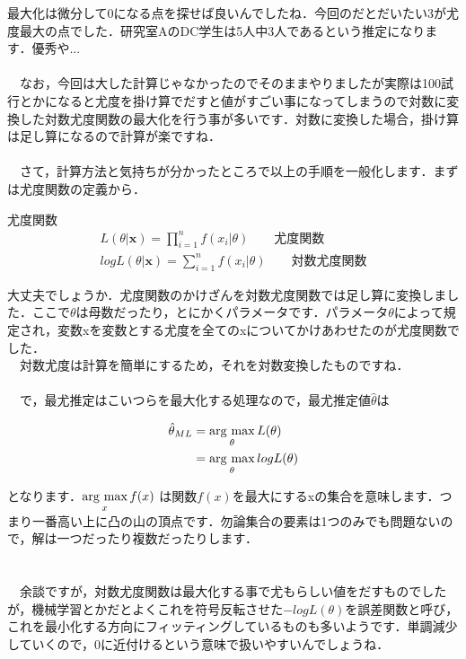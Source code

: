 \documentclass[11pt,a4paper]{ujreport} 	%
\newcommand{\argmax}{\mathop{\rm arg~max}\limits}
\begin{document}
最大化は微分して0になる点を探せば良いんでしたね．今回のだとだいたい3が尤度最大の点でした．研究室AのDC学生は5人中3人であるという推定になります．優秀や...\\
\\
　なお，今回は大した計算じゃなかったのでそのままやりましたが実際は100試行とかになると尤度を掛け算でだすと値がすごい事になってしまうので対数に変換した対数尤度関数の最大化を行う事が多いです．対数に変換した場合，掛け算は足し算になるので計算が楽ですね．\\
\\
　さて，計算方法と気持ちが分かったところで以上の手順を一般化します．まずは尤度関数の定義から．

\begin{screen}
尤度関数
\begin{align}
L(\theta|\mathbf{x}) = \prod_{i=1} ^n f(x_i|\theta) \qquad \text{尤度関数}\\
logL(\theta|\mathbf{x}) = \sum_{i=1}^n f(x_i|\theta) \qquad \text{対数尤度関数}
\end{align}
\end{screen}

大丈夫でしょうか．尤度関数のかけざんを対数尤度関数では足し算に変換しました．ここで$\theta$は母数だったり，とにかくパラメータです．パラメータ$\theta$によって規定され，変数xを変数とする尤度を全てのxについてかけあわせたのが尤度関数でした．\\
　対数尤度は計算を簡単にするため，それを対数変換したものですね．\\
\\
　で，最尤推定はこいつらを最大化する処理なので，最尤推定値$\hat\theta$は


\begin{align}
\label{eq:ML2}
\hat\theta_{ML} &= \argmax_\theta L(\theta) \\
&= \argmax_\theta logL(\theta)
\end{align}

となります．$\argmax_x f(x)$ は関数$f(x)$を最大にするxの集合を意味します．つまり一番高い上に凸の山の頂点です．勿論集合の要素は1つのみでも問題ないので，解は一つだったり複数だったりします．\\
\\
\\
　余談ですが，対数尤度関数は最大化する事で尤もらしい値をだすものでしたが，機械学習とかだとよくこれを符号反転させた$-logL(\theta)$を誤差関数と呼び，これを最小化する方向にフィッティングしているものも多いようです．単調減少していくので，0に近付けるという意味で扱いやすいんでしょうね．
\end{document}
